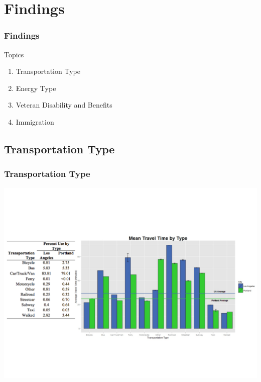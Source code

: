 \documentclass{beamer}
\begin{document}
\section{Findings}
\begin{frame}
\frametitle{Findings}
Topics 
\begin{enumerate}
\item Transportation Type 
\item Energy Type 
\item Veteran Disability and Benefits
\item Immigration 
\end{enumerate}

\end{frame}

\subsection{Transportation Type}
\begin{frame}
\frametitle{Transportation Type}
\begin{center} 
\includegraphics[width=1 \textwidth]{AndrewPlot}

\end{center}


\end{frame}
\end{document}
